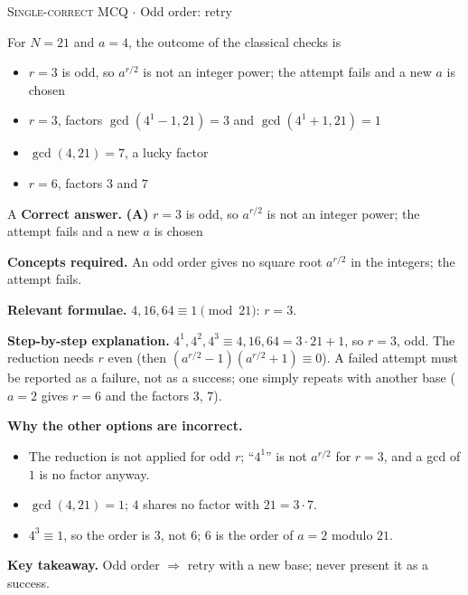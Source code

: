 \documentclass[11pt,a4paper]{article}
\newcommand{\optlabel}[1]{\textbf{(#1)}}
\newcommand{\correctlabel}[1]{\textcolor{okgreen}{\textbf{(#1)}\,\ding{51}}}
\newenvironment{qitem}[1]{\begin{list}{}{\setlength{\leftmargin}{3.3em}\setlength{\labelwidth}{3.1em}%
  \setlength{\labelsep}{0.2em}\setlength{\topsep}{3pt}\setlength{\parsep}{3pt}}\item[\textbf{Q.#1}\hfill]}{\end{list}}
\newcommand{\qsep}{\par\vspace{2pt}{\color{black!15}\hrule}\vspace{4pt}}
\newcommand{\qmeta}[2]{{\footnotesize\color{black!60}\textsc{#1} \;$\cdot$\; #2}\par}
\begin{document}
\begin{qitem}{44}
\qmeta{Single-correct MCQ}{Odd order: retry}
For $N = 21$ and $a = 4$, the outcome of the classical checks is
\begin{itemize}[leftmargin=2.6em, labelsep=0.4em, itemsep=2pt, topsep=3pt]
\item[\correctlabel{A}] $r = 3$ is odd, so $a^{r/2}$ is not an integer power; the attempt fails and a new $a$ is chosen
\item[\optlabel{B}] $r = 3$, factors $\gcd(4^1 - 1, 21) = 3$ and $\gcd(4^1 + 1, 21) = 1$
\item[\optlabel{C}] $\gcd(4, 21) = 7$, a lucky factor
\item[\optlabel{D}] $r = 6$, factors $3$ and $7$
\end{itemize}
\end{qitem}
\begin{solbox}{A}
\textbf{\color{brand}Correct answer.} \textcolor{okgreen}{\textbf{(A)}} $r = 3$ is odd, so $a^{r/2}$ is not an integer power; the attempt fails and a new $a$ is chosen

\textbf{\color{brand}Concepts required.} An odd order gives no square root $a^{r/2}$ in the integers; the attempt fails.

\textbf{\color{brand}Relevant formulae.} $4, 16, 64 \equiv 1 \pmod{21}$: $r = 3$.

\textbf{\color{brand}Step-by-step explanation.} $4^1, 4^2, 4^3 \equiv 4, 16, 64 = 3\cdot21 + 1$, so $r = 3$, odd. The reduction needs $r$ even (then $(a^{r/2} - 1)(a^{r/2} + 1) \equiv 0$). A failed attempt must be
reported as a failure, not as a success; one simply repeats with another base ($a = 2$ gives $r = 6$ and the factors $3$, $7$).

\textbf{\color{brand}Why the other options are incorrect.}
\begin{itemize}[leftmargin=2.4em, itemsep=1pt, topsep=2pt]
\item[\textbf{(B)}] The reduction is not applied for odd $r$; ``$4^{1}$'' is not $a^{r/2}$ for $r = 3$, and a gcd of $1$ is no factor anyway.
\item[\textbf{(C)}] $\gcd(4, 21) = 1$; $4$ shares no factor with $21 = 3\cdot7$.
\item[\textbf{(D)}] $4^3 \equiv 1$, so the order is $3$, not $6$; $6$ is the order of $a = 2$ modulo $21$.
\end{itemize}
\textbf{\color{brand}Key takeaway.} Odd order $\Rightarrow$ retry with a new base; never present it as a success.
\end{solbox}
\qsep
\end{document}
